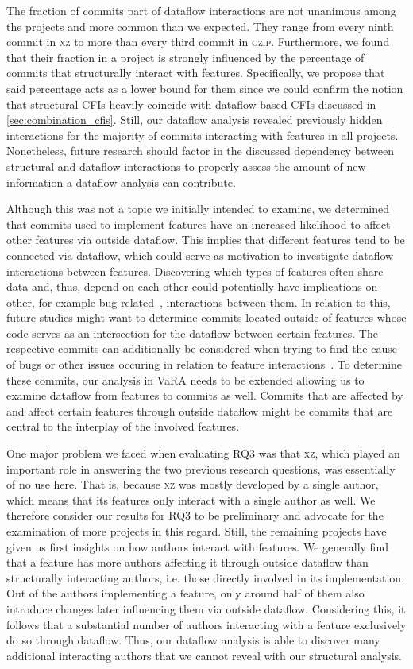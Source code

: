The fraction of commits part of dataflow interactions are not unanimous among the projects and more common than we expected.
They range from every ninth commit in \textsc{xz} to more than every third commit in \textsc{gzip}.
Furthermore, we found that their fraction in a project is strongly influenced by the percentage of commits that structurally interact with features.
Specifically, we propose that said percentage acts as a lower bound for them since we could confirm the notion that structural CFIs heavily coincide with dataflow-based CFIs discussed in \autoref{sec:combination_cfis}.
Still, our dataflow analysis revealed previously hidden interactions for the majority of commits interacting with features in all projects.
Nonetheless, future research should factor in the discussed dependency between structural and dataflow interactions to properly assess the amount of new information a dataflow analysis can contribute. 

Although this was not a topic we initially intended to examine, we determined that commits used to implement features have an increased likelihood to affect other features via outside dataflow.
This implies that different features tend to be connected via dataflow, which could serve as motivation to investigate dataflow interactions between features.
Discovering which types of features often share data and, thus, depend on each other could potentially have implications on other, for example bug-related~\cite{nie2011survey}, interactions between them.
In relation to this, future studies might want to determine commits located outside of features whose code serves as an intersection for the dataflow between certain features.
The respective commits can additionally be considered when trying to find the cause of bugs or other issues occuring in relation to feature interactions~\cite{apel2014feature}.
To determine these commits, our analysis in VaRA needs to be extended allowing us to examine dataflow from features to commits as well.
Commits that are affected by and affect certain features through outside dataflow might be commits that are central to the interplay of the involved features. 

One major problem we faced when evaluating RQ3 was that \textsc{xz}, which played an important role in answering the two previous research questions, was essentially of no use here.
That is, because \textsc{xz} was mostly developed by a single author, which means that its features only interact with a single author as well.
We therefore consider our results for RQ3 to be preliminary and advocate for the examination of more projects in this regard.
Still, the remaining projects have given us first insights on how authors interact with features.
We generally find that a feature has more authors affecting it through outside dataflow than structurally interacting authors, i.e. those directly involved in its implementation.
Out of the authors implementing a feature, only around half of them also introduce changes later influencing them via outside dataflow.
Considering this, it follows that a substantial number of authors interacting with a feature exclusively do so through dataflow.
Thus, our dataflow analysis is able to discover many additional interacting authors that we cannot reveal with our structural analysis.

